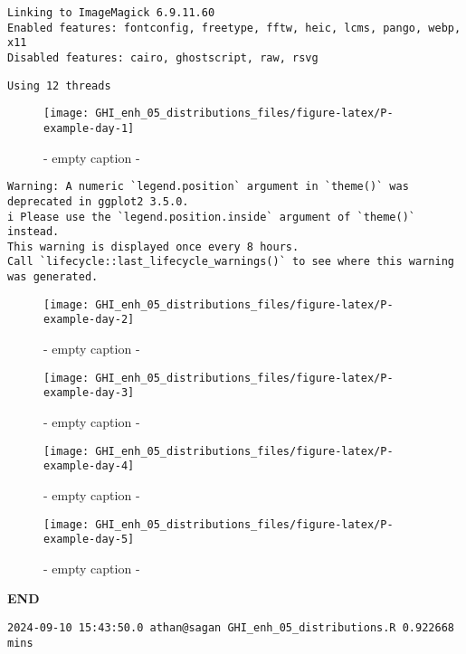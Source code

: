 \documentclass[
  10pt,
  a4paper,oneside]{article}
\begin{document}
\begin{verbatim}
Linking to ImageMagick 6.9.11.60
Enabled features: fontconfig, freetype, fftw, heic, lcms, pango, webp, x11
Disabled features: cairo, ghostscript, raw, rsvg
\end{verbatim}

\begin{verbatim}
Using 12 threads
\end{verbatim}

\begin{figure}[H]

{\centering \texttt{[image: GHI\_enh\_05\_distributions\_files/figure-latex/P-example-day-1]} 

}

\caption{ - empty caption - }\label{fig:P-example-day-1}
\end{figure}

\begin{verbatim}
Warning: A numeric `legend.position` argument in `theme()` was deprecated in ggplot2 3.5.0.
i Please use the `legend.position.inside` argument of `theme()` instead.
This warning is displayed once every 8 hours.
Call `lifecycle::last_lifecycle_warnings()` to see where this warning was generated.
\end{verbatim}

\begin{figure}[H]

{\centering \texttt{[image: GHI\_enh\_05\_distributions\_files/figure-latex/P-example-day-2]} 

}

\caption{ - empty caption - }\label{fig:P-example-day-2}
\end{figure}
\begin{figure}[H]

{\centering \texttt{[image: GHI\_enh\_05\_distributions\_files/figure-latex/P-example-day-3]} 

}

\caption{ - empty caption - }\label{fig:P-example-day-3}
\end{figure}
\begin{figure}[H]

{\centering \texttt{[image: GHI\_enh\_05\_distributions\_files/figure-latex/P-example-day-4]} 

}

\caption{ - empty caption - }\label{fig:P-example-day-4}
\end{figure}
\begin{figure}[H]

{\centering \texttt{[image: GHI\_enh\_05\_distributions\_files/figure-latex/P-example-day-5]} 

}

\caption{ - empty caption - }\label{fig:P-example-day-5}
\end{figure}

\textbf{END}

\begin{verbatim}
2024-09-10 15:43:50.0 athan@sagan GHI_enh_05_distributions.R 0.922668 mins
\end{verbatim}
\end{document}
